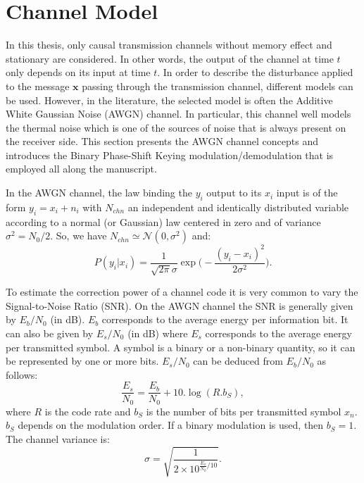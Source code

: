 \section{Channel Model}
\label{sec:ctx_awgn}

In this thesis, only causal transmission channels without memory effect and
stationary are considered. In other words, the output of the channel at time $t$
only depends on its input at time $t$. In order to describe the disturbance
applied to the message $\bm{x}$ passing through the transmission channel,
different models can be used. However, in the literature, the selected model is
often the Additive White Gaussian Noise (AWGN) channel. In particular, this
channel well models the thermal noise which is one of the sources of noise
that is always present on the receiver side. This section presents the AWGN
channel concepts and introduces the Binary Phase-Shift Keying
modulation/demodulation that is employed all along the manuscript.

In the AWGN channel, the law binding the $y_i$ output to its $x_i$ input is of
the form $y_i = x_i + n_i$ with $N_{chn}$ an independent and identically
distributed variable according to a normal (or Gaussian) law centered in zero
and of variance $\sigma^2 = N_0 / 2$. So, we have $N_{chn} \simeq \mathcal{N}(0,
\sigma^2)$ and:
\begin{equation}
P(y_i|x_i) = \frac{1}{\sqrt{2\pi}\sigma}\exp{\Big(-\frac{(y_i-x_i)^2}{2\sigma^2}\Big)}.
\end{equation}

To estimate the correction power of a channel code it is very common to vary the
Signal-to-Noise Ratio (SNR). On the AWGN channel the SNR is generally given by
$E_b/N_0$ (in dB). $E_b$ corresponds to the average energy per information bit.
It can also be given by $E_s/N_0$ (in dB) where $E_s$ corresponds to the average
energy per transmitted symbol. A symbol is a binary or a non-binary quantity, so
it can be represented by one or more bits. $E_s/N_0$ can be deduced from
$E_b/N_0$ as follows:
\begin{equation}
\frac{E_s}{N_0} = \frac{E_b}{N_0} + 10.\log{(R.b_S)},
\end{equation}
where $R$ is the code rate and $b_S$ is the number of bits per transmitted
symbol $x_n$. $b_S$ depends on the modulation order. If a binary modulation is
used, then $b_S = 1$. The channel variance is:
\begin{equation}
\sigma = \sqrt{\frac{1}{2 \times 10^{\frac{E_s}{N_0} / 10}}}.
\end{equation}

